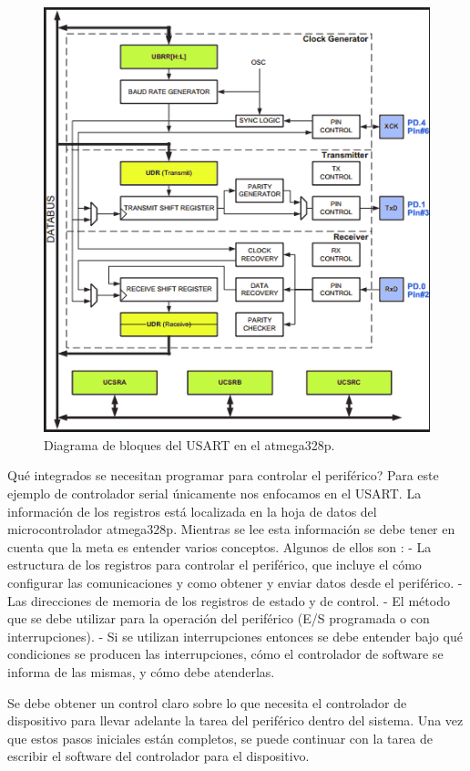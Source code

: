 \documentclass[12pt]{article}
\begin{document}
\begin{figure}
\includegraphics[width=\linewidth]{usart-block.png}
\caption{Diagrama de bloques del USART en el atmega328p.}
\label{fig:usart-block}
\end{figure}


Qué integrados se necesitan programar para controlar el periférico?
Para este ejemplo de controlador serial únicamente nos enfocamos
en el USART. La información de los registros está localizada en la hoja
de datos del microcontrolador atmega328p. Mientras se lee esta información
se debe tener en cuenta que la meta es entender varios conceptos. Algunos
de ellos son :
- La estructura de los registros para controlar el periférico, que incluye
el cómo configurar las comunicaciones y como obtener y enviar
datos desde el periférico.
- Las direcciones de memoria de los registros de estado y de control.
- El método que se debe utilizar para la operación del periférico (E/S 
programada o con interrupciones).
- Si se utilizan interrupciones entonces se debe entender bajo qué condiciones
se producen las interrupciones, cómo el controlador de software se informa
de las mismas, y cómo debe atenderlas.

Se debe obtener un control claro sobre lo que necesita el controlador 
de dispositivo para llevar adelante la tarea del periférico dentro del
sistema. Una vez que estos pasos iniciales están completos, 
se puede continuar con la tarea de escribir el software del controlador
para el dispositivo.
\end{document}
